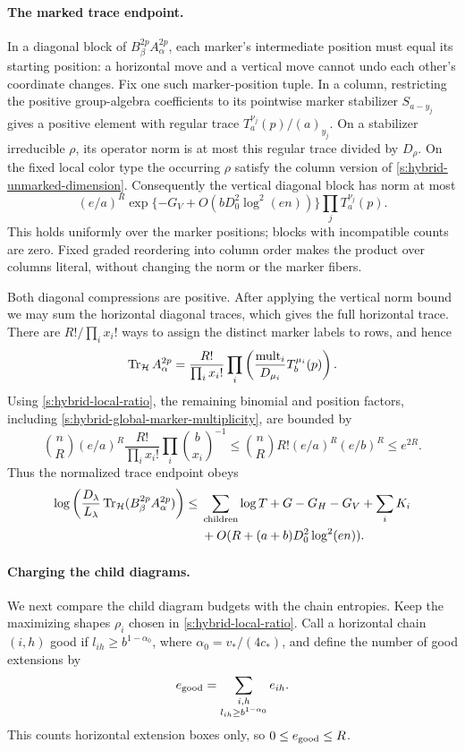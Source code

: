 \paragraph{The marked trace endpoint.}
In a diagonal block of $B_\beta^{2p}A_\alpha^{2p}$, each marker's
intermediate position must equal its starting position: a horizontal
move and a vertical move cannot undo each other's coordinate changes.
Fix one such marker-position tuple. In a column, restricting the
positive group-algebra coefficients to its pointwise marker
stabilizer $S_{a-y_j}$ gives a positive element with regular trace
$T_a^{\nu_j}(p)/(a)_{y_j}$. On a stabilizer irreducible $\rho$,
its operator norm is at most this regular trace divided by $D_\rho$.
On the fixed local color type the occurring $\rho$ satisfy the
column version of \eqref{s:hybrid-unmarked-dimension}.
Consequently the vertical diagonal block has norm at most
\[
 (e/a)^R
 \exp\{-G_V+O(bD_0^2\log^2(en))\}
 \prod_jT_a^{\nu_j}(p).
\]
This holds uniformly over the marker positions; blocks with
incompatible counts are zero. Fixed graded reordering into column
order makes the product over columns literal, without changing
the norm or the marker fibers.

Both diagonal compressions are positive. After applying the vertical
norm bound we may sum the horizontal diagonal traces, which gives
the full horizontal trace. There are $R!/\prod_i x_i!$ ways to
assign the distinct marker labels to rows, and hence
\[
 \operatorname{Tr}_{\mathcal H}A_\alpha^{2p}
 =\frac{R!}{\prod_i x_i!}
       \prod_i\left(\frac{\operatorname{mult}_i}{D_{\mu_i}}
                         T_b^{\mu_i}(p)\right).
\]
Using \eqref{s:hybrid-local-ratio}, the remaining binomial and
position factors, including \eqref{s:hybrid-global-marker-multiplicity},
are bounded by
\[
 \binom nR(e/a)^R
       \frac{R!}{\prod_i x_i!}\prod_i\binom b{x_i}^{-1}
 \le \binom nR R!(e/a)^R(e/b)^R
 \le e^{2R}.
\]
Thus the normalized trace endpoint obeys
\begin{equation}\label{rec:hybrid-marked-trace}
 \begin{split}
 \log\left(\frac{D_\lambda}{L_\lambda}
           \operatorname{Tr}_{\mathcal H}(B_\beta^{2p}A_\alpha^{2p})\right)
 \le{}&\sum_{\rm children}\log T
       +G-G_H-G_V+\sum_iK_i\\
     &+O(R+(a+b)D_0^2\log^2(en)).
 \end{split}
\end{equation}

\paragraph{Charging the child diagrams.}
We next compare the child diagram budgets with the chain entropies.
Keep the maximizing shapes $\rho_i$ chosen in
\eqref{s:hybrid-local-ratio}. Call a horizontal chain $(i,h)$ good
if $l_{ih}\ge b^{1-\alpha_0}$, where
$\alpha_0=v_*/(4c_*)$, and define the number of good extensions by
\[
 e_{\rm good}=\sum_{\substack{i,h\\ l_{ih}\ge b^{1-\alpha_0}}}e_{ih}.
\]
This counts horizontal extension boxes only, so
$0\le e_{\rm good}\le R$.

